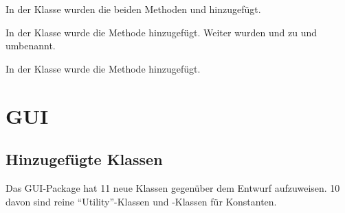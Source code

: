 In der Klasse  wurden die beiden  Methoden  und  hinzugefügt.

In der Klasse  wurde die  Methode  hinzugefügt.
Weiter wurden  und  zu  und  umbenannt.

In der Klasse  wurde die  Methode  hinzugefügt.

\section{GUI}

\subsection{Hinzugefügte Klassen}


Das GUI-Package hat 11 neue Klassen gegenüber dem Entwurf aufzuweisen. 10 davon sind reine \enquote{Utility}-Klassen und -Klassen für Konstanten.

